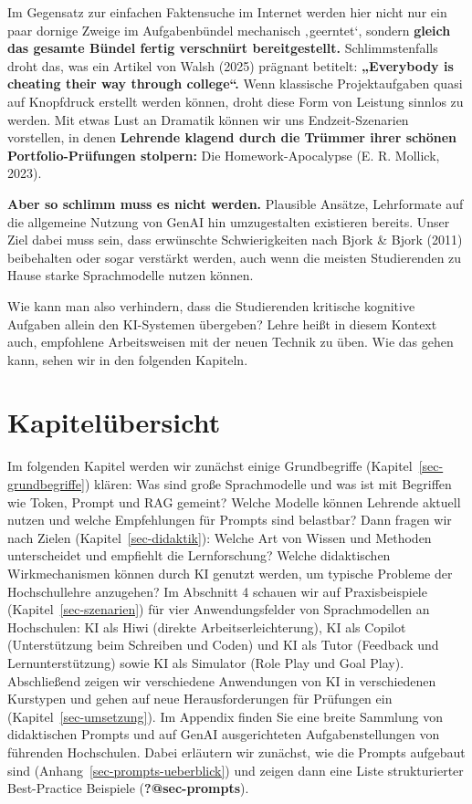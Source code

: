 \documentclass[
  ngerman,
  letterpaper,
  DIV=11]{scrreprt}
\begin{document}
Im Gegensatz zur einfachen Faktensuche im Internet werden hier nicht nur
ein paar dornige Zweige im Aufgabenbündel mechanisch ‚geerntet`, sondern
\textbf{gleich das gesamte Bündel fertig verschnürt bereitgestellt.}
Schlimmstenfalls droht das, was ein Artikel von Walsh (2025) prägnant
betitelt: \textbf{„Everybody is cheating their way through college``.}
Wenn klassische Projektaufgaben quasi auf Knopfdruck erstellt werden
können, droht diese Form von Leistung sinnlos zu werden. Mit etwas Lust
an Dramatik können wir uns Endzeit-Szenarien vorstellen, in denen
\textbf{Lehrende klagend durch die Trümmer ihrer schönen
Portfolio-Prüfungen stolpern:} Die Homework-Apocalypse (E. R. Mollick,
2023).

\textbf{Aber so schlimm muss es nicht werden.} Plausible Ansätze,
Lehrformate auf die allgemeine Nutzung von GenAI hin umzugestalten
existieren bereits. Unser Ziel dabei muss sein, dass erwünschte
Schwierigkeiten nach Bjork \& Bjork (2011) beibehalten oder sogar
verstärkt werden, auch wenn die meisten Studierenden zu Hause starke
Sprachmodelle nutzen können.

Wie kann man also verhindern, dass die Studierenden kritische kognitive
Aufgaben allein den KI-Systemen übergeben? Lehre heißt in diesem Kontext
auch, empfohlene Arbeitsweisen mit der neuen Technik zu üben. Wie das
gehen kann, sehen wir in den folgenden Kapiteln.

\section{Kapitelübersicht}\label{sec-kapiteluebersicht}

Im folgenden Kapitel werden wir zunächst einige Grundbegriffe
(Kapitel~\ref{sec-grundbegriffe}) klären: Was sind große Sprachmodelle
und was ist mit Begriffen wie Token, Prompt und RAG gemeint? Welche
Modelle können Lehrende aktuell nutzen und welche Empfehlungen für
Prompts sind belastbar? Dann fragen wir nach Zielen
(Kapitel~\ref{sec-didaktik}): Welche Art von Wissen und Methoden
unterscheidet und empfiehlt die Lernforschung? Welche didaktischen
Wirkmechanismen können durch KI genutzt werden, um typische Probleme der
Hochschullehre anzugehen? Im Abschnitt 4 schauen wir auf Praxisbeispiele
(Kapitel~\ref{sec-szenarien}) für vier Anwendungsfelder von
Sprachmodellen an Hochschulen: KI als Hiwi (direkte
Arbeitserleichterung), KI als Copilot (Unterstützung beim Schreiben und
Coden) und KI als Tutor (Feedback und Lernunterstützung) sowie KI als
Simulator (Role Play und Goal Play). Abschließend zeigen wir
verschiedene Anwendungen von KI in verschiedenen Kurstypen und gehen auf
neue Herausforderungen für Prüfungen ein (Kapitel~\ref{sec-umsetzung}).
Im Appendix finden Sie eine breite Sammlung von didaktischen Prompts und
auf GenAI ausgerichteten Aufgabenstellungen von führenden Hochschulen.
Dabei erläutern wir zunächst, wie die Prompts aufgebaut sind
(Anhang~\ref{sec-prompts-ueberblick}) und zeigen dann eine Liste
strukturierter Best-Practice Beispiele (\textbf{?@sec-prompts}).
\end{document}
